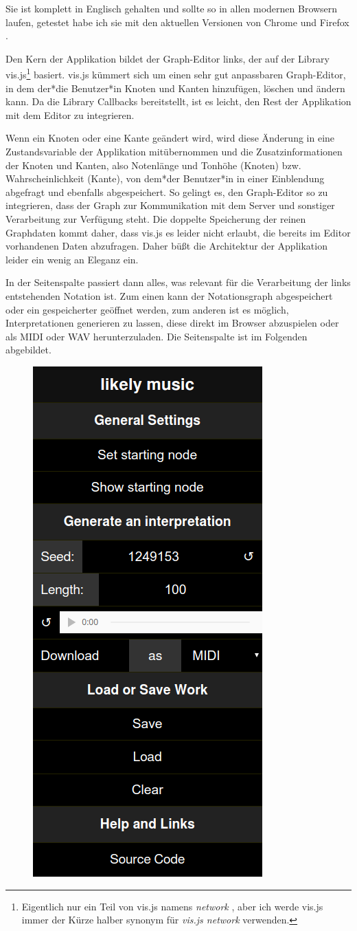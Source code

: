 \documentclass[a4paper,twocolumn]{article}
\begin{document}
Sie ist komplett in Englisch gehalten und sollte so in allen modernen Browsern
laufen, getestet habe ich sie mit den aktuellen Versionen von Chrome
\cite{chrome} und Firefox \cite{firefox}.

Den Kern der Applikation bildet der Graph-Editor links, der auf der Library
vis.js\footnote{Eigentlich nur ein Teil von vis.js namens {\it network}
\cite{visjs_network}, aber
ich werde vis.js immer der Kürze halber synonym für {\it vis.js network} verwenden.}
\cite{visjs} basiert. vis.js kümmert sich um einen sehr gut anpassbaren
Graph-Editor, in dem der*die Benutzer*in Knoten und Kanten hinzufügen, löschen und
ändern kann. Da die Library Callbacks \cite{wikipedia_callback} bereitstellt,
ist es leicht, den Rest der Applikation mit dem Editor zu integrieren.

Wenn ein Knoten oder eine Kante geändert wird, wird diese Änderung in eine
Zustandsvariable
der Applikation mitübernommen und die Zusatzinformationen der Knoten und
Kanten, also Notenlänge und Tonhöhe (Knoten) bzw. Wahrscheinlichkeit (Kante),
von dem*der Benutzer*in in einer Einblendung abgefragt und ebenfalls
abgespeichert. So gelingt es, den
Graph-Editor so zu integrieren, dass der Graph zur Kommunikation mit dem Server
und sonstiger Verarbeitung zur Verfügung steht. Die doppelte Speicherung der
reinen Graphdaten kommt daher, dass
vis.js es leider nicht erlaubt, die bereits im Editor vorhandenen Daten
abzufragen. Daher büßt die Architektur der Applikation leider ein wenig
an Eleganz ein.

In der Seitenspalte passiert dann alles, was relevant für die Verarbeitung der
links entstehenden Notation ist. Zum einen kann der Notationsgraph abgespeichert
oder ein gespeicherter geöffnet werden, zum anderen ist es möglich,
Interpretationen generieren zu lassen, diese direkt im Browser abzuspielen oder
als MIDI oder WAV herunterzuladen. Die Seitenspalte ist im Folgenden abgebildet.

\begin{figure}
  \begin{center}
    \includegraphics[width=.25\textwidth]{screenshots/sidebar}
  \end{center}
\end{figure}
\end{document}
